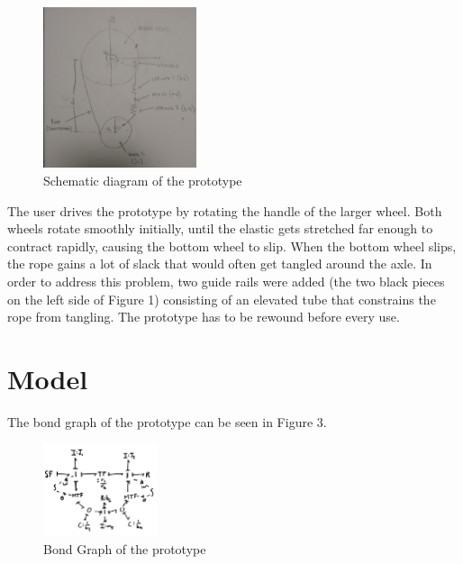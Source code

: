 \documentclass[twoside,twocolumn]{article}
\begin{document}
\begin{figure}[!h]
    \caption{Schematic diagram of the prototype}
    \centering
        \includegraphics[width=0.4\textwidth]{schematic.jpg}
\end{figure}

The user drives the prototype by rotating the handle of the larger wheel. Both wheels rotate smoothly initially, until the elastic gets stretched far enough to contract rapidly, causing the bottom wheel to slip. When the bottom wheel slips, the rope gains a lot of slack that would often get tangled around the axle. In order to address this problem, two guide rails were added (the two black pieces on the left side of Figure 1) consisting of an elevated tube that constrains the rope from tangling. The prototype has to be rewound before every use.



\section{Model}

The bond graph of the prototype can be seen in Figure 3.
\begin{figure}[!h]
    \caption{Bond Graph of the prototype}
    \centering
        \includegraphics[width=0.3\textwidth]{bg.png}
\end{figure}
\end{document}

